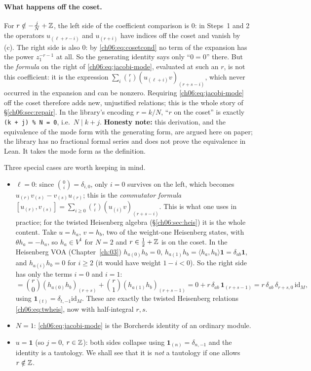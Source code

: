 \paragraph{What happens off the coset.}  For $r\notin-\frac jN+{\mathbb{Z}}$, the left side of the
coefficient comparison is $0$: in Steps~1 and 2 the operators $u_{(\ell+r-i)}$ and $u_{(r+i)}$ have
indices off the coset and vanish by (c).  The right side is also $0$: by
\eqref{ch06:eq:cosetcond} no term of the expansion has the power $z_1^{-r-1}$ at all.  So the
generating identity says only ``$0=0$'' there.  But the \emph{formula} on the right of
\eqref{ch06:eq:jacobi-mode}, evaluated at such an $r$, is not this coefficient: it is the
expression $\sum_i\binom ri(u_{(\ell+i)}v)_{(r+s-i)}$, which never occurred in the expansion and
can be nonzero.  Requiring \eqref{ch06:eq:jacobi-mode} off the coset therefore adds new,
unjustified relations; this is the whole story of \S\ref{ch06:sec:repair}.  In the library's
encoding $r=k/N$, ``$r$ on the coset'' is exactly \texttt{(k + j) \% N = 0}, i.e.\ $N\mid k+j$.
\textbf{Honesty note:} this derivation, and the equivalence of the mode form with the generating
form, are argued here on paper; the library has no fractional formal series and does not prove the
equivalence in Lean.  It takes the mode form as the definition.

Three special cases are worth keeping in mind.
\begin{itemize}
\item $\ell=0$: since $\binom0i=\delta_{i,0}$, only $i=0$ survives on the left, which becomes
  $u_{(r)}v_{(s)}-v_{(s)}u_{(r)}$; this is the \emph{commutator formula}
  $[u_{(r)},v_{(s)}]=\sum_{i\ge0}\binom ri(u_{(i)}v)_{(r+s-i)}$.  This is what one uses in
  practice; for the twisted Heisenberg algebra (\S\ref{ch06:sec:heis}) it is the whole content.
  Take $u=h_a$, $v=h_b$, two of the weight-one Heisenberg states, with $\theta h_a=-h_a$, so
  $h_a\in V^1$ for $N=2$ and $r\in\frac12+{\mathbb{Z}}$ is on the coset.  In the Heisenberg VOA
  (Chapter~\ref{ch:03}) $h_{a(0)}h_b=0$, $h_{a(1)}h_b=\langle h_a,h_b\rangle\mathbf 1=
  \delta_{ab}\mathbf 1$, and $h_{a(i)}h_b=0$ for $i\ge2$ (it would have weight $1-i<0$).  So the
  right side has only the terms $i=0$ and $i=1$:
  \begin{equation*}
    [h_{a(r)},h_{b(s)}]=\binom r0(h_{a(0)}h_b)_{(r+s)}+\binom r1(h_{a(1)}h_b)_{(r+s-1)}
    =0+r\,\delta_{ab}\,\mathbf 1_{(r+s-1)}=r\,\delta_{ab}\,\delta_{r+s,0}\,\mathrm{id}_M,
  \end{equation*}
  using $\mathbf 1_{(t)}=\delta_{t,-1}\mathrm{id}_M$.  These are exactly the twisted Heisenberg
  relations \eqref{ch06:eq:twheis}, now with half-integral $r,s$.
\item $N=1$: \eqref{ch06:eq:jacobi-mode} is the Borcherds identity of an ordinary module.
\item $u=\mathbf 1$ (so $j=0$, $r\in{\mathbb{Z}}$): both sides collapse using $\mathbf 1_{(n)}=\delta_{n,-1}$
  and the identity is a tautology.  We shall see that it is \emph{not} a tautology if one allows
  $r\notin{\mathbb{Z}}$.
\end{itemize}

